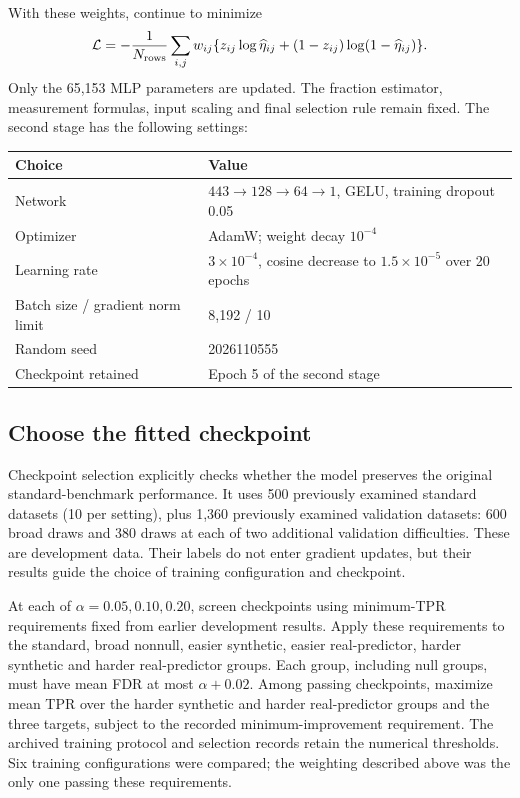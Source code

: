 \documentclass[10pt,letterpaper]{article}
\begin{document}
With these weights, continue to minimize
\[
 \mathcal L=-\frac{1}{N_{\rm rows}}\sum_{i,j}w_{ij}
 \{z_{ij}\log\widehat\eta_{ij}+(1-z_{ij})\log(1-\widehat\eta_{ij})\}.
\]
Only the 65,153 MLP parameters are updated. The fraction estimator,
measurement formulas, input scaling and final selection rule remain fixed.
The second stage has the following settings:
\begin{center}\small
\begin{tabular}{ll}\toprule
Choice & Value\\\midrule
Network & $443\to128\to64\to1$, GELU, training dropout 0.05\\
Optimizer & AdamW; weight decay $10^{-4}$\\
Learning rate & $3\times10^{-4}$, cosine decrease to $1.5\times10^{-5}$ over 20 epochs\\
Batch size / gradient norm limit & 8,192 / 10\\
Random seed & 2026110555\\
Checkpoint retained & Epoch 5 of the second stage\\\bottomrule
\end{tabular}\end{center}

\subsection{Choose the fitted checkpoint}
Checkpoint selection explicitly checks whether the model preserves
the original standard-benchmark performance. It uses 500 previously
examined standard datasets (10 per setting), plus 1,360 previously
examined validation datasets: 600 broad draws and 380 draws at each of
two additional validation difficulties. These are development data.
Their labels do not enter gradient updates, but their results guide the
choice of training configuration and checkpoint.

At each of $\alpha=0.05,0.10,0.20$, screen checkpoints using minimum-TPR
requirements fixed from earlier development results. Apply these requirements
to the standard, broad nonnull, easier synthetic, easier real-predictor,
harder synthetic and harder real-predictor groups. Each group, including
null groups, must have mean FDR at most $\alpha+0.02$. Among passing
checkpoints, maximize mean TPR over the harder synthetic and harder
real-predictor groups and the three targets, subject to the recorded
minimum-improvement requirement. The archived training protocol and
selection records retain the numerical thresholds. Six training
configurations were compared; the weighting described above was the only
one passing these requirements.
\end{document}
